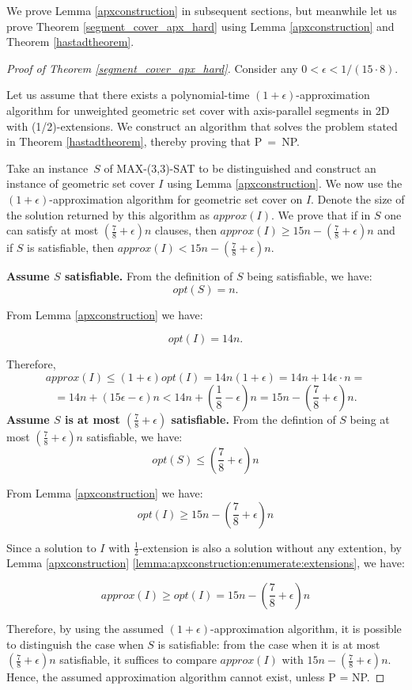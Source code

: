 We prove Lemma \ref{apxconstruction} in
subsequent sections, but meanwhile let us prove
Theorem \ref{segment_cover_apx_hard} using Lemma \ref{apxconstruction}
and Theorem \ref{hastadtheorem}.

\begin{proof}[Proof of Theorem \ref{segment_cover_apx_hard}]
Consider any $0 < \epsilon < 1/(15 \cdot 8)$.

Let us assume that there exists a polynomial-time
$(1+\epsilon)$-approximation algorithm
for unweighted geometric set cover with axis-parallel segments in 2D
with (1/2)-extensions.
We construct an algorithm that solves the problem stated in 
Theorem \ref{hastadtheorem}, thereby proving that P~=~NP.

Take an instance~$S$ of MAX-(3,3)-SAT to be distinguished
and construct an instance of geometric set cover $I$
using Lemma \ref{apxconstruction}.
We now use the $(1+\epsilon)$-approximation algorithm
for geometric set cover on $I$.
Denote the size of the solution returned by this algorithm as $approx(I)$.
We prove that 
if in $S$
one can satisfy at most $(\frac{7}{8}+\epsilon)n$ clauses,
then $approx(I) \ge 15n - (\frac{7}{8} + \epsilon)n$
and if $S$ is
satisfiable, then $approx(I) < 15n - (\frac{7}{8} + \epsilon)n$.


\textbf{Assume $S$ satisfiable.}
From the definition of $S$ being satisfiable, we have:
$$opt(S) = n.$$

From Lemma \ref{apxconstruction} we have:

$$opt(I) = 14n.$$

Therefore,
$$approx(I) \le (1+\epsilon)opt(I) = 14n(1+\epsilon)
	= 14n + 14\epsilon\cdot n =$$ 
	$$= 14n + (15\epsilon - \epsilon)n < 
  14n + \left(\frac{1}{8} - \epsilon\right)n 
= 15n - \left(\frac{7}{8} + \epsilon\right)n.$$
\textbf{Assume $S$ is at most 
$\left(\frac{7}{8} + \epsilon\right)$ satisfiable.}
From the defintion of $S$ being at most 
$\left(\frac{7}{8} + \epsilon\right)n$ satisfiable, we have:
$$opt(S) \le \left(\frac{7}{8} + \epsilon\right)n$$

From Lemma \ref{apxconstruction} we have:
$$opt(I) \ge 15n - \left(\frac{7}{8} + \epsilon\right)n$$

Since a solution to $I$ with $\frac{1}{2}$-extension is
also a solution without any extention, by 
Lemma \ref{apxconstruction} \ref{lemma:apxconstruction:enumerate:extensions}, we have:

$$approx(I) \ge opt(I) = 15n - \left(\frac{7}{8} + \epsilon\right)n$$


Therefore, by using the assumed $(1+\epsilon)$-approximation
algorithm,
it is possible to distinguish the case when
$S$ is satisfiable: from the case when it is
at most $(\frac{7}{8} + \epsilon)n$ satisfiable,
it suffices to compare $approx(I)$ with $15n - (\frac{7}{8}+\epsilon)n$.
Hence, the assumed approximation algorithm cannot exist, unless P = NP.
\end{proof}

